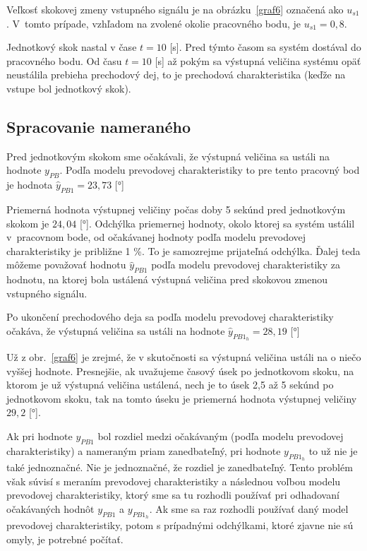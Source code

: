 \documentclass[a4paper, 10pt, ]{article}
\begin{document}
Veľkosť skokovej zmeny vstupného signálu je na obrázku~\ref{graf6} označená ako $u_{s1}$. V~tomto prípade, vzhľadom na zvolené okolie pracovného bodu, je $u_{s1} = 0,8$.

Jednotkový skok nastal v čase $t=10$ [s]. Pred týmto časom sa systém dostával do pracovného bodu. Od času $t=10$ [s] až pokým sa výstupná veličina systému opäť neustálila prebieha prechodový dej, to je prechodová charakteristika (keďže na vstupe bol jednotkový skok).






\subsection{Spracovanie nameraného}


Pred jednotkovým skokom sme očakávali, že výstupná veličina sa ustáli na hodnote $y_{PB}$. Podľa modelu prevodovej charakteristiky to pre tento pracovný bod je hodnota $\hat y_{PB1} = 23,73$ [°]

Priemerná hodnota výstupnej veličiny počas doby 5 sekúnd pred jednotkovým skokom je $24,04$ [°]. Odchýlka priemernej hodnoty, okolo ktorej sa systém ustálil v~pracovnom bode, od očakávanej hodnoty podľa modelu prevodovej charakteristiky je približne 1 \%. To je samozrejme prijateľná odchýlka. Ďalej teda môžeme považovať hodnotu $\hat y_{PB1}$ podľa modelu prevodovej charakteristiky za hodnotu, na ktorej bola ustálená výstupná veličina pred skokovou zmenou vstupného signálu.

Po ukončení prechodového deja sa podľa modelu prevodovej charakteristiky očakáva, že výstupná veličina sa ustáli na hodnote $\hat y_{PB1_h} = 28,19$ [°]

Už z obr.~\ref{graf6} je zrejmé, že v skutočnosti sa výstupná veličina ustáli na o niečo vyššej hodnote. Presnejšie, ak uvažujeme časový úsek po jednotkovom skoku, na ktorom je už výstupná veličina ustálená, nech je to úsek 2,5 až 5 sekúnd po jednotkovom skoku, tak na tomto úseku je priemerná hodnota výstupnej veličiny $29,2$ [°].

Ak pri hodnote $y_{PB1}$ bol rozdiel medzi očakávaným (podľa modelu prevodovej charakteristiky) a nameraným priam zanedbateľný, pri hodnote $y_{PB1_h}$ to už nie je také jednoznačné. Nie je jednoznačné, že rozdiel je zanedbateľný. Tento problém však súvisí s meraním prevodovej charakteristiky a následnou voľbou modelu prevodovej charakteristiky, ktorý sme sa tu rozhodli používať pri odhadovaní očakávaných hodnôt $y_{PB1}$ a $y_{PB1_h}$. Ak sme sa raz rozhodli používať daný model prevodovej charakteristiky, potom s prípadnými odchýlkami, ktoré zjavne nie sú omyly, je potrebné počítať.
\end{document}
